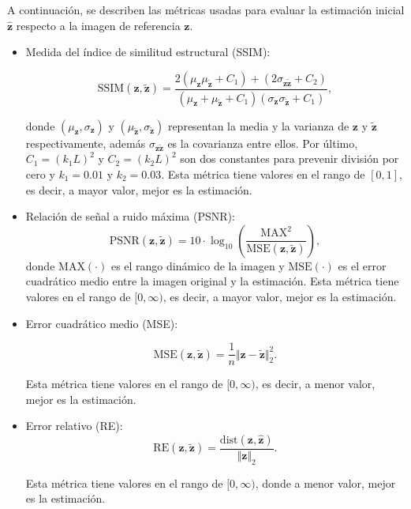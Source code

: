 A continuación, se describen las métricas usadas para evaluar la estimación inicial $\hat{\mathbf{z}}$ respecto a la imagen de referencia $\mathbf{z}$.
\begin{itemize}
    \item Medida del índice de similitud estructural (SSIM):
    
    \begin{equation}
        \mathrm{SSIM}(\mathbf{z}, \tilde{\mathbf{z}}) = \frac{2(\mu_{\mathbf{z}}\mu_{\tilde{\mathbf{z}}} + C_1) + (2\sigma_{\mathbf{z}\tilde{\mathbf{z}}} + C_2)}{(\mu_{\mathbf{z}} + \mu_{\tilde{\mathbf{z}}} + C_1)(\sigma_{\mathbf{z}}\sigma_{\tilde{\mathbf{z}}} + C_1)},
        \label{eq:SSIM}
    \end{equation}
    
    donde $(\mu_{\mathbf{z}}, \sigma_{{\mathbf{z}}})$ y $(\mu_{\tilde{\mathbf{z}}}, \sigma_{\tilde{\mathbf{z}}})$ representan la media y la varianza de ${\mathbf{z}}$ y $\tilde{\mathbf{z}}$ respectivamente, además $\sigma_{\mathbf{z}\tilde{\mathbf{z}}}$ es la covarianza entre ellos. Por último, $C_1 = (k_1L)^2$ y $C_2 = (k_2L)^2$ son dos constantes para prevenir división por cero y $k_1 = 0.01$ y $k_2 = 0.03$. Esta métrica tiene valores en el rango de $[0, 1]$, es decir, a mayor valor, mejor es la estimación.
    
    \item Relación de señal a ruido máxima (PSNR):
    \begin{equation}
        \mathrm{PSNR}(\mathbf{z}, \tilde{\mathbf{z}})=10 \cdot \log_{10}\left(\frac{\mathrm{MAX}^{2}}{\mathrm{MSE}(\mathbf{z}, \tilde{\mathbf{z}})}\right),
        \label{eq:PSNR}
    \end{equation}
    donde $\mathrm{MAX}(\cdot)$ es el rango dinámico de la imagen y $\mathrm{MSE}(\cdot)$ es el error cuadrático medio entre la imagen original y la estimación. Esta métrica tiene valores en el rango de $[0, \infty)$, es decir, a mayor valor, mejor es la estimación.
    
    \item Error cuadrático medio (MSE):
    
    \begin{equation}
        \mathrm{MSE}(\mathbf{z}, \tilde{\mathbf{z}}) = \frac{1}{n} \Vert \mathbf{z} - \tilde{\mathbf{z}}\Vert_2^2.
        \label{eq:MSE}
    \end{equation}
    
    Esta métrica tiene valores en el rango de $[0, \infty)$, es decir, a menor valor, mejor es la estimación.

    \item Error relativo (RE): 
    \begin{equation}
        \mathrm{RE}(\mathbf{z}, \tilde{\mathbf{z}}) = \frac{ \mathrm{dist}(\mathbf{z}, \hat{\mathbf{z}})}{\Vert \mathbf{z} \Vert_2}.
        \label{eq:RE}
    \end{equation}
    
    Esta métrica tiene valores en el rango de $[0, \infty)$, donde a menor valor, mejor es la estimación.
\end{itemize}
